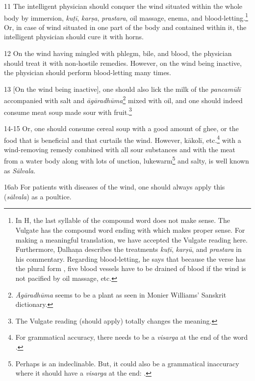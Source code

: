 \begin{translation}
    \item[11]
    The intelligent physician should conquer the wind situated within the whole body by immersion, \textit{kuṭī}, \textit{karṣa}, \textit{prastara}, oil massage, enema, and blood-letting.\footnote{In H, the last syllable  of the compound word does not make sense. The Vulgate has the compound word ending with  which makes proper sense. For making a meaningful translation, we have accepted the Vulgate reading here. Furthermore, Ḍalhaṇa describes the treatments \textit{kuṭī}, \textit{karṣū}, and \textit{prastara} in his commentary. Regarding blood-letting, he says that because the verse has the plural form , five blood vessels have to be drained of blood if the wind is not pacified by oil massage, etc.} Or, in case of wind  situated in one part of the body and contained within it, the intelligent physician should cure it with horns. 

    \item[12]
    On the wind having mingled with phlegm, bile, and blood, the physician should treat it with non-hostile remedies. However, on the wind being inactive, the physician should perform blood-letting many times. 

    \item[13]
    [On the wind being inactive], one should also lick the milk of the \emph{pancamūlī} accompanied with salt and \emph{āgāradhūma}\footnote{\emph{Āgāradhūma} seems to be a plant as seen in Monier Williams' Sanskrit dictionary.} mixed with oil, and one should indeed consume meat soup made sour with fruit.\footnote{The Vulgate reading  (should apply) totally changes the meaning.}

    \item[14-15]
    Or, one should consume cereal soup with a good amount of ghee, or the food that is beneficial and that curtails the wind. However, \gls{kākolī}, etc.\footnote{For grammatical accuracy, there needs to be a \emph{visarga} at the end of the word .} with a wind-removing remedy combined with all sour substances and with the meat from a water body along with lots of unction, lukewarm\footnote{Perhaps  is an indeclinable. But, it could also be a grammatical inaccuracy where it should have a \textit{visarga} at the end: .} and salty, is well known as \textit{Sālvala}.    

    \item[16ab]
    For patients with diseases of the wind, one should always apply this (\textit{sālvala}) as a poultice.
    

\end{translation}
